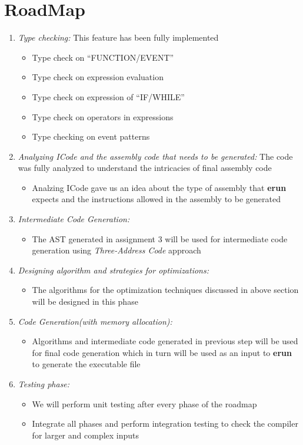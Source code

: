 \documentclass{sigchi}
\begin{document}
\section{RoadMap}

  \begin{enumerate}
    \item {\textit{Type checking:}} This feature has been fully implemented
     \begin{itemize}
       	\item Type check on “FUNCTION/EVENT”
		\item Type check on expression evaluation
        	\item Type check on expression of “IF/WHILE”
        	\item Type check on operators in expressions
        	\item Type checking on event patterns
    \end{itemize}
    \item {\textit{Analyzing ICode and the assembly code that needs to be generated:}} The code was fully analyzed to understand the intricacies of final assembly code
		\begin{itemize}
        	\item Analzing ICode gave us an idea about the type of assembly  that \textbf{erun} expects and the instructions  allowed in the assembly to be generated
        \end{itemize}
    \item {\textit{Intermediate Code Generation:}}
		\begin{itemize}
        	\item The AST generated in assignment 3 will be used for intermediate code generation using \textit{Three-Address Code} approach
        \end{itemize}
    \item {\textit{Designing algorithm and strategies for optimizations:}}
		\begin{itemize}
        	\item The algorithms for the optimization techniques discussed in above section will be designed in this phase
        \end{itemize}
    \item {\textit{Code Generation(with memory allocation):}}
		\begin{itemize}
        	\item Algorithms and intermediate code generated in previous step will be used for final code generation which in turn will be used as an input to \textbf{erun} to generate the executable file
        \end{itemize}
	\item {\textit{Testing phase:}}
		\begin{itemize}
        	\item We will perform unit testing after every phase of the roadmap
            \item Integrate all phases and perform integration testing to check the compiler for larger and complex inputs
           \end{itemize}

  \end{enumerate}





\end{document}
